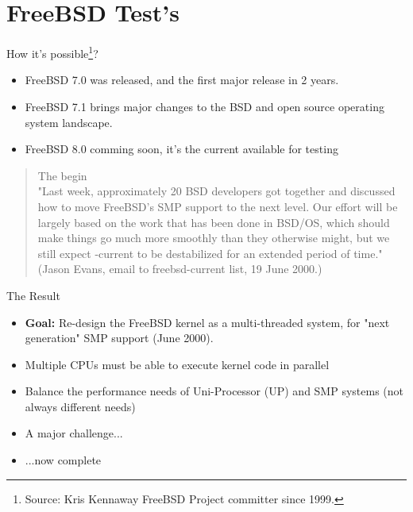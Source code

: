 \documentclass[xcolor=dvipsnames]{beamer}
\begin{document}
\section{FreeBSD Test's}
	\begin{frame}{How it's possible\footnote{\tiny{Source: Kris Kennaway FreeBSD Project committer since 1999.}}?}
	\begin{itemize}
		\item FreeBSD 7.0 was released, and the first major release in 2 years.
		\item FreeBSD 7.1 brings major changes to the BSD and open source operating system landscape.
		\item FreeBSD 8.0 comming soon, it's the current available for testing
	\end{itemize}
	\begin{quote}{The begin}
	{
		\\"Last week, approximately 20 BSD developers got together and discussed
		how to move FreeBSD's SMP support to the next level. 
		Our effort will be largely based on the work that has been done in BSD/OS, which
		should make things go much more smoothly than they otherwise might, 
		but we still expect -current to be destabilized for an extended period of time."\\
		(Jason Evans, email to freebsd-current list, 19 June 2000.)
	}
	\end{quote}
	\end{frame}
	\begin{frame}{The Result}
	\begin{itemize}
		\item \textbf{Goal:} Re-design the FreeBSD kernel as a multi-threaded system,
			for "next generation" SMP support (June 2000).
		\item Multiple CPUs must be able to execute kernel code in parallel
		\item Balance the performance needs of Uni-Processor (UP) and SMP systems (not always different needs)
		\item A major challenge...
		\item ...now complete
	\end{itemize}
	\end{frame}
	
\end{document}
